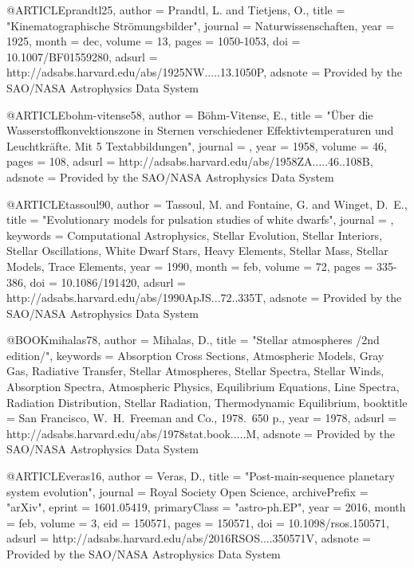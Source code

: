 \documentclass[a4paper,fleqn,usenatbib]{mnras}
\begin{document}
{{{{{@ARTICLE{prandtl25,
   author = {{Prandtl}, L. and {Tietjens}, O.},
    title = "{Kinematographische Str{\"o}mungsbilder}",
  journal = {Naturwissenschaften},
     year = 1925,
    month = dec,
   volume = 13,
    pages = {1050-1053},
      doi = {10.1007/BF01559280},
   adsurl = {http://adsabs.harvard.edu/abs/1925NW.....13.1050P},
  adsnote = {Provided by the SAO/NASA Astrophysics Data System}
}

@ARTICLE{bohm-vitense58,
   author = {{B{\"o}hm-Vitense}, E.},
    title = "{{\"U}ber die Wasserstoffkonvektionszone in Sternen verschiedener Effektivtemperaturen und Leuchtkr{\"a}fte. Mit 5 Textabbildungen}",
  journal = {\zap},
     year = 1958,
   volume = 46,
    pages = {108},
   adsurl = {http://adsabs.harvard.edu/abs/1958ZA.....46..108B},
  adsnote = {Provided by the SAO/NASA Astrophysics Data System}
}

@ARTICLE{tassoul90,
   author = {{Tassoul}, M. and {Fontaine}, G. and {Winget}, D.~E.},
    title = "{Evolutionary models for pulsation studies of white dwarfs}",
  journal = {\apjs},
 keywords = {Computational Astrophysics, Stellar Evolution, Stellar Interiors, Stellar Oscillations, White Dwarf Stars, Heavy Elements, Stellar Mass, Stellar Models, Trace Elements},
     year = 1990,
    month = feb,
   volume = 72,
    pages = {335-386},
      doi = {10.1086/191420},
   adsurl = {http://adsabs.harvard.edu/abs/1990ApJS...72..335T},
  adsnote = {Provided by the SAO/NASA Astrophysics Data System}
}


@BOOK{mihalas78,
   author = {{Mihalas}, D.},
    title = "{Stellar atmospheres /2nd edition/}",
 keywords = {Absorption Cross Sections, Atmospheric Models, Gray Gas, Radiative Transfer, Stellar Atmospheres, Stellar Spectra, Stellar Winds, Absorption Spectra, Atmospheric Physics, Equilibrium Equations, Line Spectra, Radiation Distribution, Stellar Radiation, Thermodynamic Equilibrium},
booktitle = {San Francisco, W.~H.~Freeman and Co., 1978.~650 p.},
     year = 1978,
   adsurl = {http://adsabs.harvard.edu/abs/1978stat.book.....M},
  adsnote = {Provided by the SAO/NASA Astrophysics Data System}
}




@ARTICLE{veras16,
   author = {{Veras}, D.},
    title = "{Post-main-sequence planetary system evolution}",
  journal = {Royal Society Open Science},
archivePrefix = "arXiv",
   eprint = {1601.05419},
 primaryClass = "astro-ph.EP",
     year = 2016,
    month = feb,
   volume = 3,
      eid = {150571},
    pages = {150571},
      doi = {10.1098/rsos.150571},
   adsurl = {http://adsabs.harvard.edu/abs/2016RSOS....350571V},
  adsnote = {Provided by the SAO/NASA Astrophysics Data System}
}

}}}}}
\end{document}
